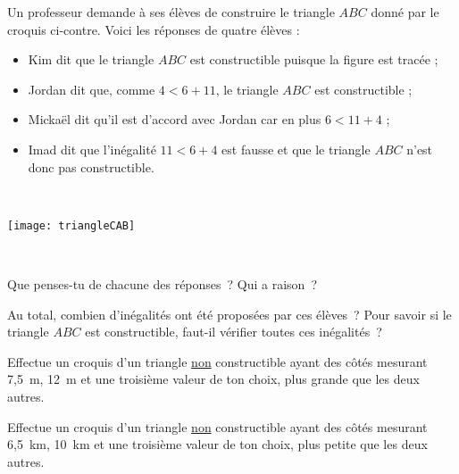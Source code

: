 \begin{activite}
Un professeur demande à ses élèves de construire le triangle $ABC$ donné par le croquis ci-contre. Voici les réponses de quatre élèves : \\[1em]
\begin{minipage}[t]{0.46\textwidth}
\begin{itemize}
 \item Kim dit que le triangle $ABC$ est constructible puisque la figure est tracée ;
 \item Jordan dit que, comme $4 < 6 + 11$,  le triangle $ABC$ est constructible ;
 \item Mickaël dit qu'il est d'accord avec Jordan car en plus $6 < 11 + 4$ ;
 \item Imad dit que l'inégalité $11 < 6 + 4$ est fausse et que le triangle $ABC$ n'est donc pas constructible.
 \end{itemize}
\end{minipage} \hfill%
\begin{minipage}[t]{0.36\textwidth}
\hfill \\
\begin{center} \texttt{[image: triangleCAB]} \end{center}
\end{minipage} \\

\begin{partie}
Que penses-tu de chacune des réponses ? Qui a raison ?
\end{partie}

\begin{partie}
Au total, combien d'inégalités ont été proposées par ces élèves ? Pour savoir si le triangle $ABC$ est constructible, faut-il vérifier toutes ces inégalités ?
\end{partie}
   
\begin{partie}
Effectue un croquis d'un triangle \underline{non} constructible ayant des côtés mesurant 7,5 m, 12 m et une troisième valeur de ton choix, plus grande que les deux autres.
\end{partie}
         
\begin{partie}
Effectue un croquis d'un triangle \underline{non} constructible ayant des côtés mesurant 6,5 km, 10 km et une troisième valeur de ton choix, plus petite que les deux autres.
\end{partie}

\end{activite}


